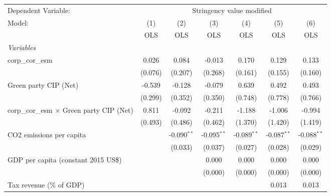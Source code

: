 
\begingroup
\centering
\begin{tabular}{lcccccc}
   \toprule
   Dependent Variable: & \multicolumn{6}{c}{Stringency value modified}\\
   Model:                                           & (1)     & (2)           & (3)           & (4)           & (5)           & (6)\\  
                                                    &  OLS    & OLS           & OLS           & OLS           & OLS           & OLS\\  
   \midrule
   \emph{Variables}\\
   corp\_cor\_esm                                   & 0.026   & 0.084         & -0.013        & 0.170         & 0.129         & 0.133\\   
                                                    & (0.076) & (0.207)       & (0.268)       & (0.161)       & (0.155)       & (0.160)\\   
   Green party CIP (Net)                            & -0.539  & -0.128        & -0.079        & 0.639         & 0.492         & 0.493\\   
                                                    & (0.299) & (0.352)       & (0.350)       & (0.748)       & (0.778)       & (0.766)\\   
   corp\_cor\_esm $\times$ Green party CIP (Net)    & 0.811   & -0.092        & -0.211        & -1.188        & -1.006        & -0.994\\   
                                                    & (0.493) & (0.486)       & (0.462)       & (1.370)       & (1.420)       & (1.419)\\   
   CO2 emissions per capita                         &         & -0.090$^{**}$ & -0.095$^{**}$ & -0.089$^{**}$ & -0.087$^{**}$ & -0.088$^{**}$\\   
                                                    &         & (0.033)       & (0.037)       & (0.027)       & (0.028)       & (0.029)\\   
   GDP per capita (constant 2015 US\$)              &         &               & 0.000         & 0.000         & 0.000         & 0.000\\   
                                                    &         &               & (0.000)       & (0.000)       & (0.000)       & (0.000)\\   
   Tax revenue (\% of GDP)                          &         &               &               &               & 0.013         & 0.013\\   

\end{tabular}
